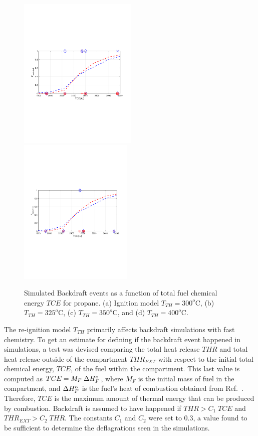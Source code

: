 \documentclass[12pt,letterpaper]{article}
\begin{document}
\begin{flushleft}
\begin{figure}[tb]
     \\
    \includegraphics[trim = 14.5mm 85mm 17mm 80mm, clip,width=0.505\textwidth]{PbvsTCE_Cign_LES_Extinction_2_TTH350_Propaneb.pdf}
    \includegraphics[trim = 22mm 85mm 17mm 80mm, clip,width=0.485\textwidth]{PbvsTCE_Cign_LES_Extinction_2_TTH400_Propaneb.pdf}
    \caption{Simulated Backdraft events as a function of total fuel chemical energy $TCE$ for propane. (a) Ignition model $T_{TH}=300^o$C, (b) $T_{TH}=325^o$C, (c) $T_{TH}=350^o$C, and (d) $T_{TH}=400^o$C. }
    \label{fig:Pb_ign}
\end{figure}
%
The re-ignition model $T_{TH}$ primarily affects backdraft simulations with fast chemistry. To get an estimate for defining if the backdraft event happened in simulations, a test was devised comparing the total heat release $THR$ and total heat release outside of the compartment $THR_{EXT}$ with respect to the initial total chemical energy, $TCE$, of the fuel within the compartment. This last value is computed as $TCE=M_F \; \Delta H_F^{\rm{o}}$, where $M_F$ is the initial mass of fuel in the compartment, and $\Delta H_F^{\rm{o}}$ is the fuel's heat of combustion obtained from Ref.~\cite{Hurley2016}. Therefore, $TCE$ is the maximum amount of thermal energy that can be produced by combustion. Backdraft is assumed to have happened if $THR>C_1 \; TCE$ and $THR_{EXT}>C_2 \; THR$. The constants $C_1$ and $C_2$ were set to 0.3, a value found to be sufficient to determine the deflagrations seen in the simulations. 


\end{flushleft}
\end{document}
